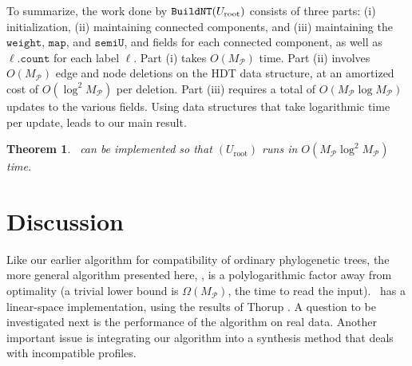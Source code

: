 \documentclass[11pt]{article}
\newcommand{\MP}{\ensuremath{M_\P}} \newcommand{\TG}{\ensuremath{\Gamma}} \newcommand{\incompatible}{\texttt{incompatible}}
\newcommand{\Uinit}{\ensuremath{U_\mathrm{root}}} \newcommand{\Ubef}{\ensuremath{U_\mathrm{bef}}} \newcommand{\Uaft}{\ensuremath{U_\mathrm{aft}}} \newcommand{\Urem}{\ensuremath{U_\mathrm{rem}}} \newcommand{\Yinit}{\ensuremath{Y_\mathrm{root}}} \newcommand{\Winit}{\ensuremath{W_\mathrm{root}}} \newcommand{\indeg}{\ensuremath{\mathrm{indegree}}} \newcommand{\Desc}{\ensuremath{\mathrm{Desc}}}
\renewcommand{\P}{\ensuremath{\mathcal{P}}}
\newcommand{\cnt}{\ensuremath{\mathtt{count}}} \newcommand{\ID}{\ensuremath{\mathtt{id}}} \newcommand{\TYPE}{\ensuremath{\mathtt{in}}} \newcommand{\SIZE}{\ensuremath{\mathtt{size}}} \newcommand{\COUNT}{\ensuremath{\mathtt{count}}} \newcommand{\SET}{\ensuremath{\mathtt{set}}} \newcommand{\SEMI}{\ensuremath{\mathtt{semiU}}} \newcommand{\LABEL}{\ensuremath{\mathtt{label}}} \newcommand{\WEIGHT}{\ensuremath{\mathtt{weight}}} \newcommand{\NULL}{\ensuremath{\mathtt{null}}} \newcommand{\MAP}{\ensuremath{\mathtt{map}}} \newcommand{\KEY}{\ensuremath{\mathtt{key}}} \newcommand{\VALUE}{\ensuremath{\mathtt{value}}} \newcommand{\KEYSET}{\ensuremath{\mathtt{keySet}}}
\newtheorem{theorem}{Theorem}
\theoremstyle{definition}
\begin{document}
To summarize, the work done by $\SLBuild(\Uinit)$ consists of three parts: (i) initialization, (ii) maintaining connected components, and (iii) maintaining the \WEIGHT, \MAP, and \SEMI, and fields for each connected component, as well as $\ell.\cnt$ for each label $\ell$. Part (i) takes $O(\MP)$ time. Part (ii) involves $O(\MP)$ edge and node deletions on the HDT data structure, at an amortized cost of $O(\log^2 \MP)$ per deletion. Part (iii) requires a total of $O(\MP \log \MP)$ updates to the various fields.  Using data structures that take logarithmic time per update, leads to our main result.  


\begin{theorem}\label{thm:SLBuildA}
\SLBuild\ can be implemented so that \SLBuild$(\Uinit)$ runs in $O(\MP \log^2 \MP)$ time.
\end{theorem}

\section{Discussion\label{sec:discussion}}

Like our earlier algorithm for compatibility of ordinary phylogenetic trees, the more general algorithm presented here, \SLBuild, is a polylogarithmic factor away from optimality (a trivial lower bound is $\Omega(\MP)$, the time to read the input).  \SLBuild\ has a linear-space implementation, using the results of Thorup \cite{Thorup2000}.  A question to be investigated next is the performance of the algorithm on real data.  Another important issue is integrating our algorithm into a synthesis method that deals with incompatible profiles. 
\end{document}
